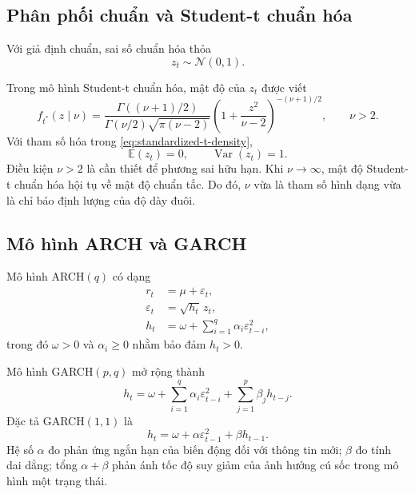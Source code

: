 \documentclass[12pt,a4paper]{article}
\numberwithin{equation}{section}
\newcommand{\E}{\mathbb{E}}
\newcommand{\Var}{\operatorname{Var}}
\begin{document}
\subsection{Phân phối chuẩn và Student-t chuẩn hóa}\label{subsec:student-t}

Với giả định chuẩn, sai số chuẩn hóa thỏa
\begin{equation}
  z_t\sim\mathcal{N}(0,1).
  \label{eq:normal-error}
\end{equation}

Trong mô hình Student-t chuẩn hóa, mật độ của $z_t$ được viết
\begin{equation}
  f_{t^*}(z\mid\nu)
  =
  \frac{\Gamma\!\left((\nu+1)/2\right)}
       {\Gamma(\nu/2)\sqrt{\pi(\nu-2)}}
  \left(1+\frac{z^2}{\nu-2}\right)^{-(\nu+1)/2},
  \qquad \nu>2.
  \label{eq:standardized-t-density}
\end{equation}
Với tham số hóa trong \cref{eq:standardized-t-density},
\begin{equation}
  \E(z_t)=0,
  \qquad
  \Var(z_t)=1.
  \label{eq:standardized-t-moments}
\end{equation}
Điều kiện $\nu>2$ là cần thiết để phương sai hữu hạn. Khi $\nu\to\infty$, mật độ Student-t chuẩn hóa hội tụ về mật độ chuẩn tắc. Do đó, $\nu$ vừa là tham số hình dạng vừa là chỉ báo định lượng của độ dày đuôi.

\subsection{Mô hình ARCH và GARCH}\label{subsec:arch-garch-theory}

Mô hình ARCH$(q)$ có dạng
\begin{align}
  r_t &= \mu + \varepsilon_t, \\
  \varepsilon_t &= \sqrt{h_t}\,z_t, \\
  h_t &= \omega+\sum_{i=1}^{q}\alpha_i\varepsilon_{t-i}^2,
  \label{eq:archq}
\end{align}
trong đó $\omega>0$ và $\alpha_i\ge 0$ nhằm bảo đảm $h_t>0$.

Mô hình GARCH$(p,q)$ mở rộng thành
\begin{equation}
  h_t
  =
  \omega
  +\sum_{i=1}^{q}\alpha_i\varepsilon_{t-i}^{2}
  +\sum_{j=1}^{p}\beta_j h_{t-j}.
  \label{eq:garchpq}
\end{equation}
Đặc tả GARCH$(1,1)$ là
\begin{equation}
  h_t=\omega+\alpha\varepsilon_{t-1}^2+\beta h_{t-1}.
  \label{eq:garch11}
\end{equation}
Hệ số $\alpha$ đo phản ứng ngắn hạn của biến động đối với thông tin mới; $\beta$ đo tính dai dẳng; tổng $\alpha+\beta$ phản ánh tốc độ suy giảm của ảnh hưởng cú sốc trong mô hình một trạng thái.
\end{document}
